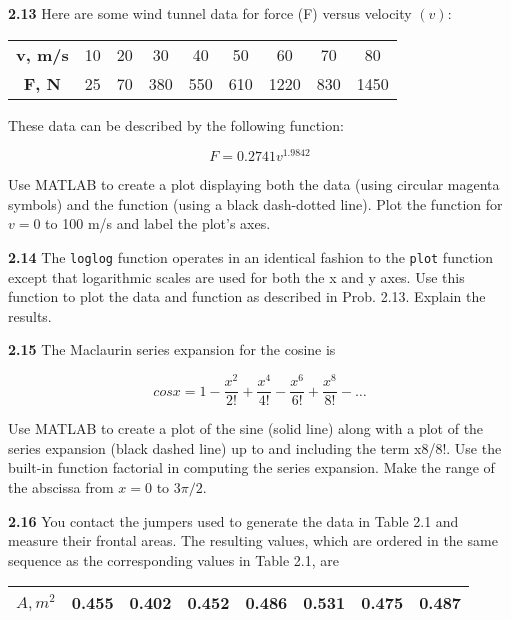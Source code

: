 \documentclass[../main.tex]{subfiles}
\begin{document}
\begin{multicols}{2}
\textbf{2.13} Here are some wind tunnel data for force (F) versus
velocity $(v)$:

	\begin{flushleft}
	\begin{small}
		
	
	\begin{tabular}{ccccccccc}
		\hline
		\textbf{v, m/s} &10& 20& 30 &40& 50 &60 &70 &80	\\
		\textbf{F, N} &25 &70 &380 &550 &610 &1220 &830 &1450\\
		\hline
	
	\end{tabular}
\end{small}
\end{flushleft}



These data can be described by the following function:


$$F=0.2741v^{1.9842} $$

Use MATLAB to create a plot displaying both the data (using
circular magenta symbols) and the function (using a black
dash-dotted line). Plot the function for $v = 0$ to 100 m/s and
label the plot's axes.


\textbf{2.14} The \texttt{loglog} function operates in an identical fashion
to the \texttt{plot} function except that logarithmic scales are used
for both the x and y axes. Use this function to plot the data
and function as described in Prob. 2.13. Explain the results.



\textbf{2.15} The Maclaurin series expansion for the cosine is

$$cosx = 1 - \dfrac{x^2}{2!}+ \dfrac{x^4}{4!}- \dfrac{x^6}{6!}+ \dfrac{x^8}{8!}- \ldots $$


Use MATLAB to create a plot of the sine (solid line) along
with a plot of the series expansion (black dashed line) up
to and including the term x8/8!. Use the built-in function
factorial in computing the series expansion. Make the
range of the abscissa from $x = 0$ to $3\pi /2$.


\textbf{2.16} You contact the jumpers used to generate the data in
Table 2.1 and measure their frontal areas. The resulting
values, which are ordered in the same sequence as the
corresponding values in Table 2.1, are
\begin{flushleft}
	\begin{scriptsize}
	\begin{tabular}{cccccccc}
		\hline
		\textbf{$A, m^2$} &0.455 &0.402 &0.452& 0.486 &0.531 &0.475 &0.487\\
		\hline
		

\end{tabular}
\end{scriptsize}
\end{flushleft}
\end{multicols}
\end{document}
